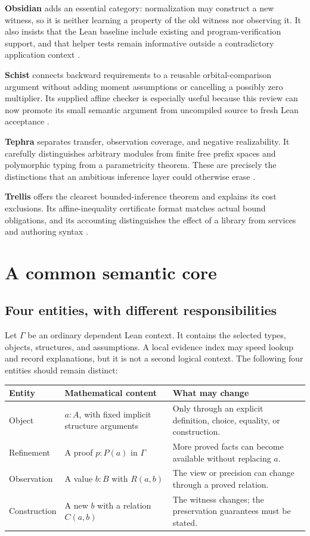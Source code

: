 \documentclass[11pt,letterpaper]{article}
\newcommand{\code}[1]{\texttt{\detokenize{#1}}}
\theoremstyle{definition}\newtheorem{definition}[proposition]{Definition}
\theoremstyle{remark}\newtheorem{remark}[proposition]{Remark}
\begin{document}
\textbf{Obsidian} adds an essential category: normalization may construct a new
witness, so it is neither learning a property of the old witness nor observing
it. It also insists that the Lean baseline include existing \code{fun_prop}
and program-verification support, and that helper tests remain informative
outside a contradictory application context \cite[Sections 2, 6, 12, 14]{obsidian}.

\textbf{Schist} connects backward requirements to a reusable orbital-comparison
argument without adding moment assumptions or cancelling a possibly zero
multiplier. Its supplied affine checker is especially useful because this
review can now promote its small semantic argument from uncompiled source to
fresh Lean acceptance \cite[Sections 7, 9, 16]{schist}.

\textbf{Tephra} separates transfer, observation coverage, and negative
realizability. It carefully distinguishes arbitrary modules from finite free
prefix spaces and polymorphic typing from a parametricity theorem. These are
precisely the distinctions that an ambitious inference layer could otherwise
erase \cite[Sections 7--8, 13]{tephra}.

\textbf{Trellis} offers the clearest bounded-inference theorem and explains its
cost exclusions. Its affine-inequality certificate format matches actual bound
obligations, and its accounting distinguishes the effect of a library from
services and authoring syntax \cite[Sections 7, 13, 18]{trellis}.

\section{A common semantic core}\label{sec:core}

\subsection{Four entities, with different responsibilities}
Let $\Gamma$ be an ordinary dependent Lean context. It contains the selected
types, objects, structures, and assumptions. A local evidence index may speed
lookup and record explanations, but it is not a second logical context.
The following four entities should remain distinct:

\begin{center}\small
\begin{tabularx}{\textwidth}{@{}l Y Y@{}}
\toprule Entity & Mathematical content & What may change\\\midrule
Object & $a:A$, with fixed implicit structure arguments & Only through an explicit definition, choice, equality, or construction.\\
Refinement & A proof $p:P(a)$ in $\Gamma$ & More proved facts can become available without replacing $a$.\\
Observation & A value $b:B$ with $R(a,b)$ & The view or precision can change through a proved relation.\\
Construction & A new $b$ with a relation $C(a,b)$ & The witness changes; the preservation guarantees must be stated.\\
\bottomrule
\end{tabularx}
\end{center}
\end{document}
